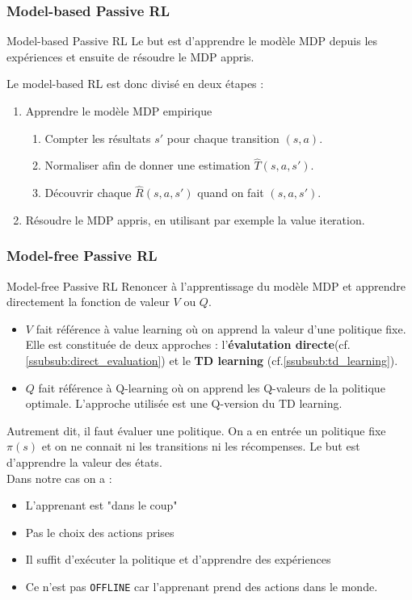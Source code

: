 \subsubsection{Model-based Passive RL} %
\label{ssub:model_based_passive_rl}
\begin{definition}{Model-based Passive RL}{}
    Le but est d'apprendre le modèle MDP depuis les expériences et ensuite de résoudre le MDP appris.
\end{definition}
Le model-based RL est donc divisé en deux étapes :
\begin{enumerate}
    \item Apprendre le modèle MDP empirique 
    \begin{enumerate}
        \item Compter les résultats $s'$ pour chaque transition $(s,a)$.
        \item Normaliser afin de donner une estimation $\hat{T}(s,a,s')$.
        \item Découvrir chaque $\hat{R}(s,a,s')$ quand on fait $(s,a,s')$.
    \end{enumerate}
    \item Résoudre le MDP appris, en utilisant par exemple la value iteration.
\end{enumerate}

\subsubsection{Model-free Passive RL} %
\label{ssub:model_free_passive_rl}
\begin{definition}{Model-free Passive RL}{}
    Renoncer à l'apprentissage du modèle MDP et apprendre directement la fonction de valeur $V$ ou $Q$.\\
    \begin{itemize}[label=\textbullet]
        \item $V$ fait référence à value learning où on apprend la valeur d'une politique fixe. Elle est constituée
        de deux approches : l'\textbf{évalutation directe}(cf.\ref{ssubsub:direct_evaluation}) et le \textbf{TD learning}
        (cf.\ref{ssubsub:td_learning}).
        \item $Q$ fait référence à Q-learning où on apprend les Q-valeurs de la politique optimale. L'approche utilisée
        est une Q-version du TD learning.
    \end{itemize}
\end{definition}
Autrement dit, il faut évaluer une politique. On a en entrée un politique fixe $\pi(s)$ et on ne connait ni les transitions
ni les récompenses. Le but est d'apprendre la valeur des états.\\
Dans notre cas on a :
\begin{itemize}[label=\textbullet]
    \item L'apprenant est "dans le coup"
    \item Pas le choix des actions prises
    \item Il suffit d'exécuter la politique et d'apprendre des expériences
    \item Ce n'est pas \texttt{OFFLINE} car l'apprenant prend des actions dans le monde.
\end{itemize}

